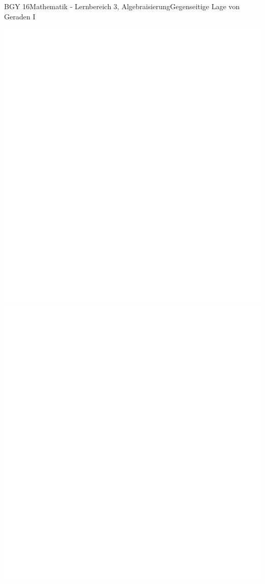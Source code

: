 \documentclass[oneside,openany,headings=optiontotoc,11pt,numbers=noenddot]{scrreprt}
\begin{document}
\begin{worksheet}{BGY 16}{Mathematik - Lernbereich 3, Algebraisierung}{Gegenseitige Lage von Geraden I}
\begin{framed}
			\newpage
			\includegraphics[scale=0.37]{../empty.jpg}\\
			\includegraphics[scale=1.14]{../empty.jpg}

\end{framed}
\end{worksheet}
\end{document}
